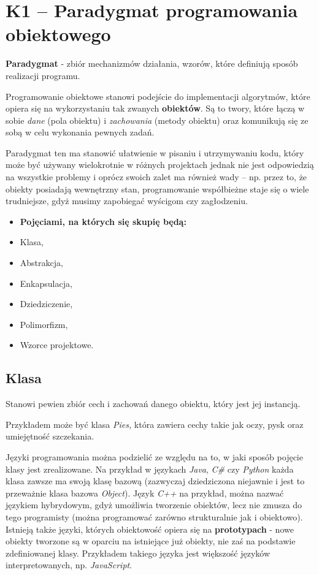 \section{K1 -- Paradygmat programowania obiektowego}

\textbf{Paradygmat} - zbiór mechanizmów działania, wzorów, które definiują sposób realizacji programu.

Programowanie obiektowe stanowi podejście do implementacji algorytmów, które opiera się na wykorzystaniu tak zwanych \textbf{obiektów}. Są to twory, które łączą w sobie \textit{dane} (pola obiektu) i \textit{zachowania} (metody obiektu) oraz komunikują się ze sobą w celu wykonania pewnych zadań.

Paradygmat ten ma stanowić ułatwienie w pisaniu i utrzymywaniu kodu, który może być używany wielokrotnie w różnych projektach jednak nie jest odpowiedzią na wszystkie problemy i oprócz swoich zalet ma również wady -- np. przez to, że obiekty posiadają wewnętrzny stan, programowanie współbieżne staje się o wiele trudniejsze, gdyż musimy zapobiegać wyścigom czy zagłodzeniu.

\begin{itemize}
	\setlength\itemsep{1pt}
	\item[] \textbf{Pojęciami, na których się skupię będą: }
	\item Klasa,
	\item Abstrakcja,
	\item Enkapsulacja,
	\item Dziedziczenie,
	\item Polimorfizm,
	\item Wzorce projektowe.
\end{itemize}

\subsection{Klasa}
Stanowi pewien zbiór cech i zachowań danego obiektu, który jest jej instancją.

Przykładem może być klasa \textit{Pies,} która zawiera cechy takie jak oczy, pysk oraz umiejętność szczekania.

Języki programowania można podzielić ze względu na to, w jaki sposób pojęcie klasy jest zrealizowane. Na przykład w językach \textit{Java}, \textit{C\#} czy \textit{Python} każda klasa zawsze ma swoją klasę bazową (zazwyczaj dziedziczona niejawnie i jest to przeważnie klasa bazowa \textit{Object}). Język \textit{C++} na przykład, można nazwać językiem hybrydowym, gdyż umożliwia tworzenie obiektów, lecz nie zmusza do tego programisty (można programować zarówno strukturalnie jak i obiektowo). Istnieją także języki, których obiektowość opiera się na \textbf{prototypach} - nowe obiekty tworzone są w oparciu na istniejące już obiekty, nie zaś na podstawie zdefiniowanej klasy. Przykładem takiego języka jest większość języków interpretowanych, np. \textit{JavaScript}.

